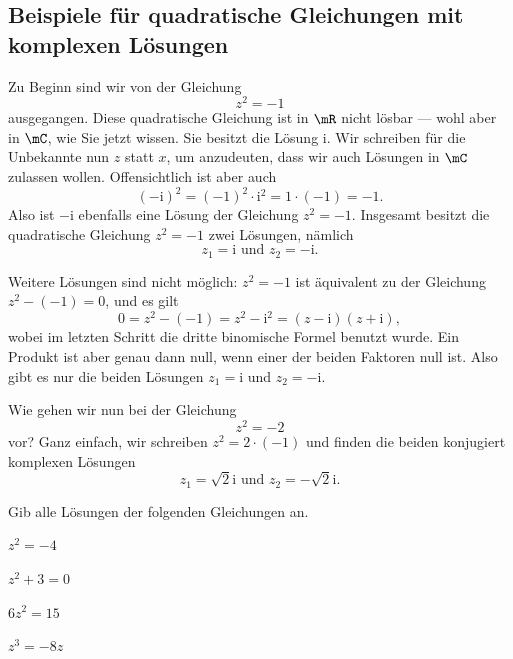 \documentclass[%
11pt,%
twoside,%
titlepage,%
german,%
headsepline%
]{scrartcl}
\begin{document}
\subsection{Beispiele f\"ur quadratische Gleichungen mit komplexen L\"osungen}
Zu Beginn sind wir von der Gleichung
$$z^2 = -1$$
ausgegangen. Diese quadratische Gleichung ist in $\mR$ nicht l\"osbar --- wohl aber in $\mC$, wie Sie jetzt wissen. Sie besitzt die L\"osung $\mathrm{i}$. Wir schreiben f\"ur die Unbekannte nun $z$ statt $x$, um anzudeuten, dass wir auch L\"osungen in $\mC$ zulassen wollen. Offensichtlich ist aber auch
$$(-\mathrm{i})^2 = (-1)^2 \cdot \mathrm{i}^2 = 1 \cdot (-1) = -1.$$
Also ist $-\mathrm{i}$ ebenfalls eine L\"osung der Gleichung $z^2 = -1$. Insgesamt besitzt die quadratische Gleichung $z^2=-1$ zwei L\"osungen, nämlich
$$z_1=\mathrm{i}\text{ und }z_2=-\mathrm{i}.$$
\begin{bem}
Weitere L\"osungen sind nicht m\"oglich: $z^2 = -1$ ist äquivalent zu der Gleichung $z^2 - (-1) = 0$, und es gilt
$$0 = z^2 -(-1) = z^2 -\mathrm{i}^2 = (z-\mathrm{i})(z+\mathrm{i}),$$
wobei im letzten Schritt die dritte binomische Formel benutzt wurde. Ein Produkt ist aber genau dann null, wenn einer der beiden Faktoren null ist. Also gibt es nur die beiden L\"osungen $z_1 = \mathrm{i}$ und $z_2 = -\mathrm{i}$.
\end{bem}
Wie gehen wir nun bei der Gleichung
$$z^2 = -2$$
vor? Ganz einfach, wir schreiben $z^2 = 2 \cdot (-1)$ und finden die beiden konjugiert komplexen L\"osungen
$$z_1 = \sqrt{2}\mathrm{i}\text{ und }z_2=-\sqrt{2}\mathrm{i}.$$

\begin{ueb}
Gib alle L\"osungen der folgenden Gleichungen an.

\begin{minipage}{3.5cm}
\begin{enumeratea}
\item $z^2=-4$
\item $z^2+3=0$
\end{enumeratea}
\end{minipage}
\begin{minipage}{3.5cm}
\begin{enumeratea}
\setcounter{enumi}{2}
\item $6z^2=15$
\item $z^3=-8z$
\end{enumeratea}
\end{minipage}
\end{ueb}
\end{document}
